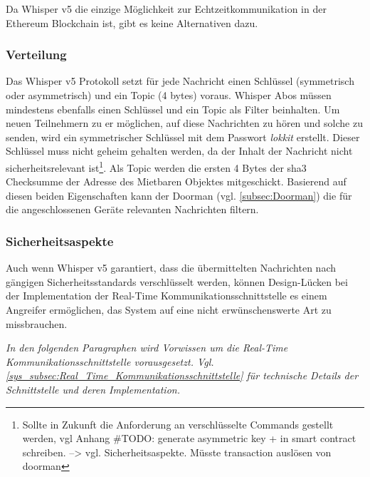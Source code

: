 Da Whisper v5 die einzige Möglichkeit zur Echtzeitkommunikation in der Ethereum Blockchain ist, gibt es keine Alternativen dazu.

\subsubsection{Verteilung}
\label{subsubsec:Verteilung}
Das Whisper v5 Protokoll setzt für jede Nachricht einen Schlüssel (symmetrisch oder asymmetrisch) und ein Topic (4 bytes) voraus. Whisper Abos müssen mindestens ebenfalls einen Schlüssel und ein Topic als Filter beinhalten. Um neuen Teilnehmern zu er möglichen, auf diese Nachrichten zu hören und solche zu senden, wird ein symmetrischer Schlüssel mit dem Passwort \emph{lokkit} erstellt. Dieser Schlüssel muss nicht geheim gehalten werden, da der Inhalt der Nachricht nicht sicherheitsrelevant ist\footnote{Sollte in Zukunft die Anforderung an verschlüsselte Commands gestellt werden, vgl Anhang \#TODO: generate asymmetric key + in smart contract schreiben. --> vgl. Sicherheitsaspekte. Müsste transaction auslösen von doorman}. Als Topic werden die ersten 4 Bytes der sha3 Checksumme der Adresse des Mietbaren Objektes mitgeschickt. Basierend auf diesen beiden Eigenschaften kann der Doorman (vgl. \ref{subsec:Doorman}) die für die angeschlossenen Geräte relevanten Nachrichten filtern.\cite[Wiki/Whisper Overview]{go-ethereum}

\subsubsection{Sicherheitsaspekte}
\label{subsubsec:Sicherheitsaspekte}
Auch wenn Whisper v5 garantiert, dass die übermittelten Nachrichten nach gängigen Sicherheitsstandards verschlüsselt werden, können Design-Lücken bei der Implementation der Real-Time Kommunikationsschnittstelle es einem Angreifer ermöglichen, das System auf eine nicht erwünschenswerte Art zu missbrauchen.\cite[Wiki/Whisper Overview/Encryption in version 5]{go-ethereum}

\emph{In den folgenden Paragraphen wird Vorwissen um die Real-Time Kommunikationsschnittstelle vorausgesetzt. Vgl. \ref{sys_subsec:Real_Time_Kommunikationsschnittstelle} für technische Details der Schnittstelle und deren Implementation.}

